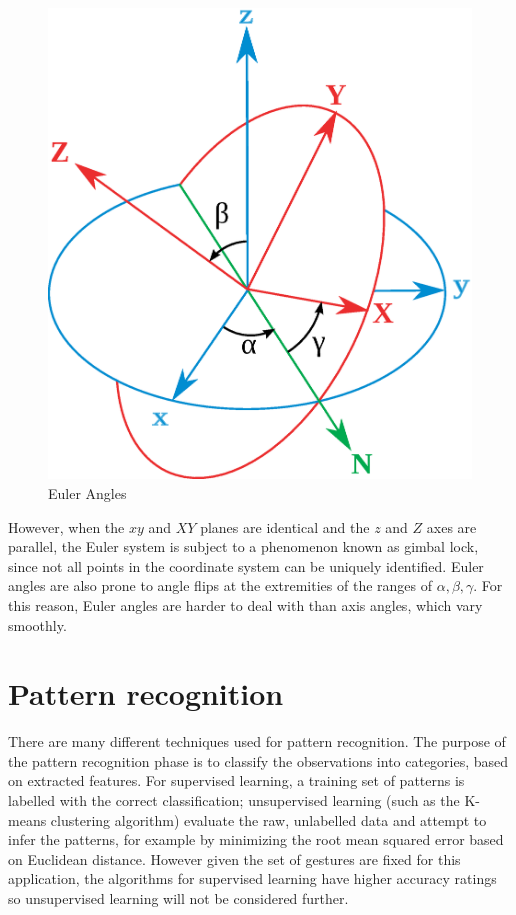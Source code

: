 \documentclass[12pt,a4,notitlepage]{report}
\renewcommand{\_}{\texttt{\symbol{95}}}
\newcommand{\<}{\texttt{\symbol{60}}}
\renewcommand{\>}{\texttt{\symbol{62}}}
\begin{document}
\begin{figure}[hb]
\centering
\includegraphics[scale=0.2,angle=0]{diagrams/eulerangles.ps}
\caption{Euler Angles}
\label{eulerangles}
\end{figure}

However, when the $xy$ and $XY$ planes are identical and the $z$ and $Z$ axes are parallel, the Euler system is subject to a phenomenon known as gimbal lock, since not all points in the coordinate system can be uniquely identified. Euler angles are also prone to angle flips at the extremities of the ranges of $\alpha,\beta,\gamma$. For this reason, Euler angles are harder to deal with than axis angles, which vary smoothly.

\section{Pattern recognition}

There are many different techniques used for pattern recognition. The purpose of the pattern recognition phase is to classify the observations into categories, based on extracted features. For supervised learning, a training set of patterns is labelled with the correct classification; unsupervised learning (such as the K-means clustering algorithm) evaluate the raw, unlabelled data and attempt to infer the patterns, for example by minimizing the root mean squared error based on Euclidean distance. However given the set of gestures are fixed for this application, the algorithms for supervised learning have higher accuracy ratings so unsupervised learning will not be considered further.
\end{document}
